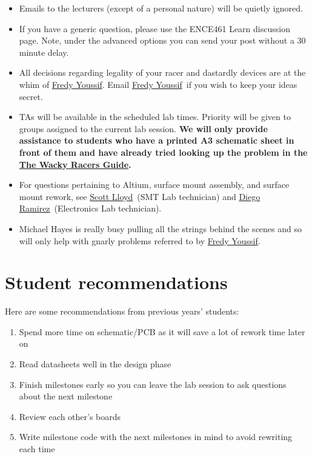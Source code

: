 \documentclass[11pt, a4paper]{article}
\makeatletter
\newcommand{\fredy}{\href{mailto:fredy.youssif@pg.canterbury.ac.nz}{Fredy Youssif}}
\newcommand{\scott}{\href{mailto:scott.lloyd@.canterbury.ac.nz}{Scott Lloyd}}
\newcommand{\diego}{\href{mailto:diego.ramirez@canterbury.ac.nz}{Diego Ramirez}}
\newcommand{\theguide}{\href{https://eng-git.canterbury.ac.nz/wacky-racers/wacky-racers/-/blob/master/doc/guide/guide.pdf}{The Wacky Racers Guide}}
\makeatother
\begin{document}
\begin{itemize}
\item Emails to the lecturers (except of a personal nature) will be
  quietly ignored.

\item If you have a generic question, please use the ENCE461 Learn
  discussion page.  Note, under the advanced options you can send your
  post without a 30\,minute delay.

\item All decisions regarding legality of your racer and dastardly
  devices are at the whim of \fredy.  Email \fredy\ if you wish to
  keep your ideas secret.

\item TAs will be available in the scheduled lab times.  Priority will
  be given to groups assigned to the current lab session. \textbf{We
    will only provide assistance to students who have a printed A3
    schematic sheet in front of them and have already tried looking up
    the problem in the \theguide.}

\item For questions pertaining to Altium, surface mount assembly, and
  surface mount rework, see \scott\ (SMT Lab technician) and
  \diego\ (Electronics Lab technician).

\item Michael Hayes is really busy pulling all the strings behind the
  scenes and so will only help with gnarly problems referred to by
  \fredy.

\end{itemize}


\section{Student recommendations}

Here are some recommendations from previous years' students:
%
\begin{enumerate}
\item Spend more time on schematic/PCB as it will save a lot of rework time later on

\item Read datasheets well in the design phase

\item Finish milestones early so you can leave the lab session to ask questions about the next milestone

\item Review each other’s boards

\item Write milestone code with the next milestones in mind to avoid rewriting each time
\end{enumerate}
\end{document}
